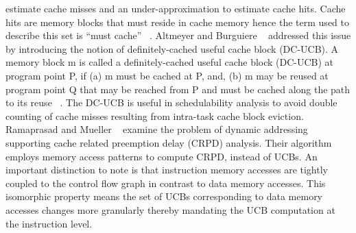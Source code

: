 estimate cache misses and an under-approximation to estimate cache hits.  Cache hits are memory blocks that must reside in cache memory hence the term used to describe this set is “must cache” ~\cite{altmeyer:11c}.  Altmeyer and Burguiere ~\cite{altmeyer:11c} addressed this issue by introducing the notion of definitely-cached useful cache block (DC-UCB).  A memory block m is called a definitely-cached useful cache block (DC-UCB) at program point P, if (a) m must be cached at P, and, (b) m may be reused at program point Q that may be reached from P and must be cached along the path to its reuse ~\cite{altmeyer:11c}.  The DC-UCB is useful in schedulability analysis to avoid double counting of cache misses resulting from intra-task cache block eviction.  Ramaprasad and Mueller ~\cite{ramaprasad:06} examine the problem of dynamic addressing supporting cache related preemption delay (CRPD) analysis. Their algorithm employs memory access patterns to compute CRPD, instead of UCBs.  An important distinction to note is that instruction memory accesses are tightly coupled to the control flow graph in contrast to data memory accesses. This isomorphic property means the set of UCBs corresponding to data memory accesses changes more granularly thereby mandating the UCB computation at the instruction level.


